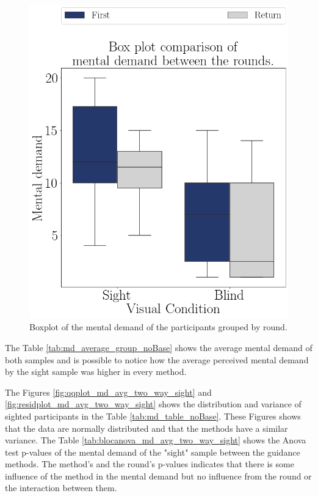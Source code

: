 \begin{figure}[!htb]
\begin{minipage}{0.45\textwidth}
        \includegraphics[width = 0.8\linewidth]{Resultados/Nasa/Figuras/png/boxplot_noBase_md_4_rounds.png}
        \caption{Boxplot of the mental demand of the participants grouped by round.}
        \label{fig:boxplot_noBase_md_4_rounds}
    \end{minipage}
\end{figure}

The Table \ref{tab:md_average_group_noBase} shows the average mental demand of both samples and is possible to notice how the average perceived mental demand by the sight sample was higher in every method.



The Figures \ref{fig:qqplot_md_avg_two_way_sight} and \ref{fig:residplot_md_avg_two_way_sight} shows the distribution and variance of sighted participants in the Table \ref{tab:md_table_noBase}. These Figures shows that the data are normally distributed and that the methods have a similar variance.
The Table \ref{tab:blocanova_md_avg_two_way_sight} shows the Anova test p-values of the mental demand of the "sight" sample between the guidance methods. The method's and the round's p-values indicates that there is some influence of the method in the mental demand but no influence from the round or the interaction between them.



